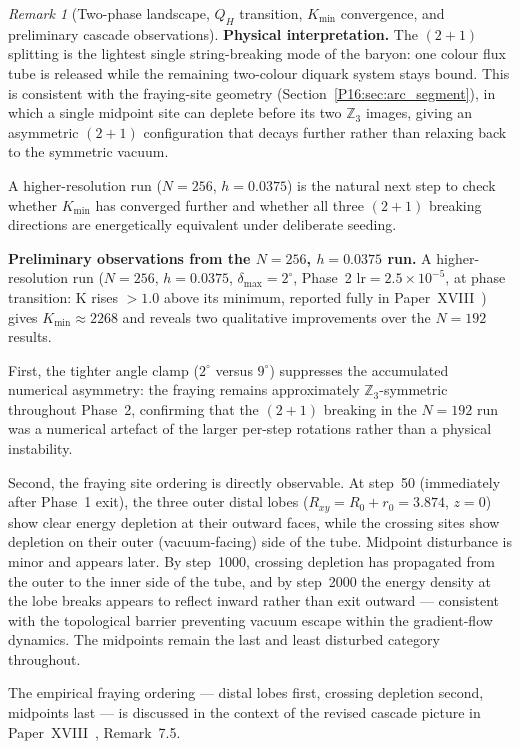\documentclass[11pt,a4paper]{article}
\theoremstyle{definition}\newtheorem{definition}[theorem]{Definition}
\theoremstyle{remark}
\newtheorem{remark}[theorem]{Remark}
\theoremstyle{definition}\newtheorem{construction}[theorem]{Construction}
\newcommand{\QH}{Q_H}
\begin{document}
\begin{remark}[Two-phase landscape, $\QH$ transition, $K_{\min}$ convergence, and preliminary cascade observations]
\textbf{Physical interpretation.}
The $(2+1)$ splitting is the lightest single string-breaking mode of
the baryon: one colour flux tube is released while the remaining
two-colour diquark system stays bound.  This is consistent with the
fraying-site geometry (Section~\ref{P16:sec:arc_segment}), in which a
single midpoint site can deplete before its two $\mathbb{Z}_3$ images,
giving an asymmetric $(2+1)$ configuration that decays further rather
than relaxing back to the symmetric vacuum.

A higher-resolution run ($N=256$, $h=0.0375$) is the natural next
step to check whether $K_{\min}$ has converged further and whether
all three $(2+1)$ breaking directions are energetically equivalent
under deliberate seeding.

\textbf{Preliminary observations from the $N=256$, $h=0.0375$ run.}
A higher-resolution run ($N=256$, $h=0.0375$, $\delta_{\max}=2^\circ$,
Phase~2 $\mathrm{lr}=2.5\times10^{-5}$, at phase transition: K rises
$> 1.0$ above its minimum, reported fully in Paper~XVIII~\cite{Paper18})
gives $K_{\min}\approx2268$ and reveals two qualitative improvements
over the $N=192$ results.

First, the tighter angle clamp ($2^\circ$ versus $9^\circ$) suppresses
the accumulated numerical asymmetry: the fraying remains approximately
$\mathbb{Z}_3$-symmetric throughout Phase~2, confirming that the $(2{+}1)$
breaking in the $N=192$ run was a numerical artefact of the larger
per-step rotations rather than a physical instability.

Second, the fraying site ordering is directly observable.  At step~50
(immediately after Phase~1 exit), the three outer distal lobes
($R_{xy}=R_0+r_0=3.874$, $z=0$) show clear energy depletion at their
outward faces, while the crossing sites show depletion on their outer
(vacuum-facing) side of the tube.  Midpoint disturbance is minor and
appears later.  By step~1000, crossing depletion has propagated from
the outer to the inner side of the tube, and by step~2000 the energy
density at the lobe breaks appears to reflect inward rather than exit
outward --- consistent with the topological barrier preventing vacuum
escape within the gradient-flow dynamics.  The midpoints remain the
last and least disturbed category throughout.

The empirical fraying ordering --- distal lobes first, crossing depletion
second, midpoints last --- is discussed in the context of the revised
cascade picture in Paper~XVIII~\cite{Paper18},
Remark~7.5.%
\end{remark}
\end{document}
